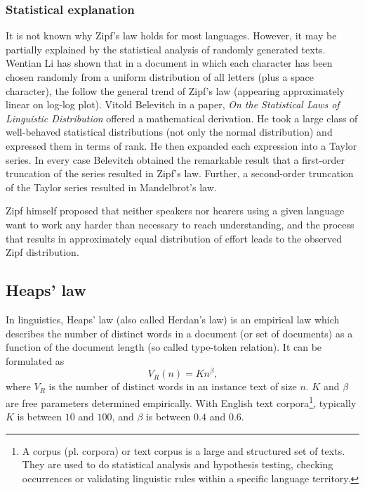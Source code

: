     \subsubsection{Statistical explanation}
      
      It is not known why Zipf's law holds for most languages.\cite{Brillouin2004} However, it may be partially explained by the statistical analysis of randomly generated texts. Wentian Li has shown that in a document in which each character has been chosen randomly from a uniform distribution of all letters (plus a space character), the  follow the general trend of Zipf's law (appearing approximately linear on log-log plot).\cite{WentianLi1992} Vitold Belevitch in a paper, \emph{On the Statistical Laws of Linguistic Distribution} offered a mathematical derivation. He took a large class of well-behaved statistical distributions (not only the normal distribution) and expressed them in terms of rank. He then expanded each expression into a Taylor series. In every case Belevitch obtained the remarkable result that a first-order truncation of the series resulted in Zipf's law. Further, a second-order truncation of the Taylor series resulted in Mandelbrot's law.\cite{Neumann2013,Belevitch1959}

      Zipf himself proposed that neither speakers nor hearers using a given language want to work any harder than necessary to reach understanding, and the process that results in approximately equal distribution of effort leads to the observed Zipf distribution.\cite{Zipf1949,CanchoSole2003}
  
  \subsection{Heaps' law}
  
    In linguistics, Heaps' law (also called Herdan's law) is an empirical law which describes the number of distinct words in a document (or set of documents) as a function of the document length (so called type-token relation). It can be formulated as
    $$V_R(n) = Kn^\beta\mbox{,}$$
    where $V_R$ is the number of distinct words in an instance text of size $n$. $K$ and $\beta$ are free parameters determined empirically. With English text corpora\footnote{A corpus (pl. corpora) or text corpus is a large and structured set of texts. They are used to do statistical analysis and hypothesis testing, checking occurrences or validating linguistic rules within a specific language territory.}, typically $K$ is between $10$ and $100$, and $\beta$ is between $0.4$ and $0.6$.

